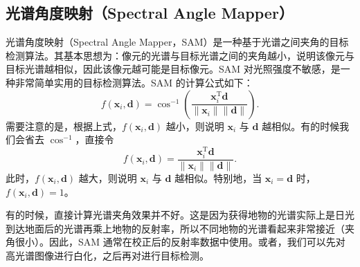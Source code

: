 \subsection{光谱角度映射（Spectral Angle Mapper）}
光谱角度映射（Spectral Angle Mapper，SAM）是一种基于光谱之间夹角的目标检测算法。其基本思想为：像元的光谱与目标光谱之间的夹角越小，说明该像元与目标光谱越相似，因此该像元越可能是目标像元。SAM 对光照强度不敏感，是一种非常简单实用的目标检测算法。SAM 的计算公式如下：
\[
    f(\bm{x}_{i}, \bm{d}) = \cos^{-1}\left(\frac{\bm{x}_{i}^{\mathrm{T}}\bm{d}}{\|\bm{x}_{i}\|\|\bm{d}\|}\right).
\]
需要注意的是，根据上式，\(f(\bm{x}_{i}, \bm{d})\) 越小，则说明 \(\bm{x}_{i}\) 与 \(\bm{d}\) 越相似。有的时候我们会省去 \(\cos^{-1}\)，直接令
\[
    f(\bm{x}_{i}, \bm{d}) = \frac{\bm{x}_{i}^{\mathrm{T}}\bm{d}}{\|\bm{x}_{i}\|\|\bm{d}\|}.
\]
此时，\(f(\bm{x}_{i}, \bm{d})\) 越大，则说明 \(\bm{x}_{i}\) 与 \(\bm{d}\) 越相似。特别地，当 \(\bm{x}_{i} = \bm{d}\) 时，\(f(\bm{x}_{i}, \bm{d}) = 1\)。

有的时候，直接计算光谱夹角效果并不好。这是因为获得地物的光谱实际上是日光到达地面后的光谱再乘上地物的反射率，所以不同地物的光谱看起来非常接近（夹角很小）。因此，SAM 通常在校正后的反射率数据中使用。或者，我们可以先对高光谱图像进行白化，之后再对进行目标检测。

